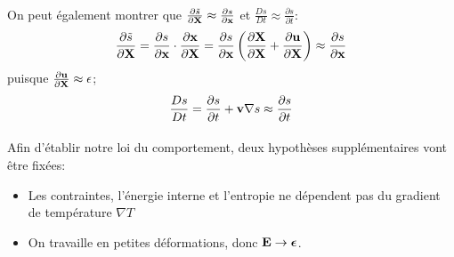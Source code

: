 \paragraph{}
On peut également montrer que $\frac{\partial\tilde{s}}{\partial\textbf{X}}\approx\frac{\partial s}{\partial\textbf{x}}$ et $\frac{Ds}{Dt}\approx\frac{\partial s}{\partial t}$:
$$\frac{\partial\tilde{s}}{\partial\textbf{X}}=\frac{\partial s}{\partial\textbf{x}}\cdot\frac{\partial\textbf{x}}{\partial\textbf{X}}=\frac{\partial s}{\partial\textbf{x}}\left(\frac{\partial\textbf{X}}{\partial \textbf{X}}+\frac{\partial\textbf{u}}{\partial\textbf{X}}\right)\approx\frac{\partial s}{\partial \textbf{x}}$$ puisque $\frac{\partial\textbf{u}}{\partial\textbf{X}}\approx\epsilon$;
$$\frac{Ds}{Dt}=\frac{\partial s}{\partial t}+\textbf{v}\nabla s\approx\frac{\partial s}{\partial t}$$
\paragraph{}
Afin d'établir notre loi du comportement, deux hypothèses supplémentaires vont être fixées:
\begin{itemize}
\item Les contraintes, l'énergie interne et l'entropie ne dépendent pas du gradient de température $\nabla T$
\item On travaille en petites déformations, donc $\textbf{E}\rightarrow \boldsymbol{\epsilon}$.
\end{itemize}
\paragraph{}
